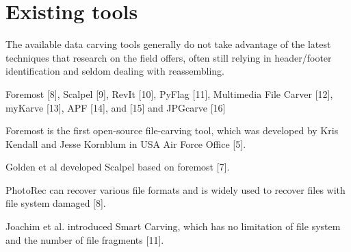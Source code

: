 \section{Existing tools}

The available data carving tools generally do not take advantage of the latest techniques that research on the field offers, often still relying in header/footer identification and seldom dealing with reassembling.

\cite{ali_review_2018}
Foremost [8], Scalpel [9],
RevIt [10], PyFlag [11], Multimedia File Carver
[12], myKarve [13], APF [14], and [15] and
JPGcarve [16]

\cite{qiu_new_2014}
Foremost is the first open-source file-carving tool, which
was developed by Kris Kendall and Jesse Kornblum in USA
Air Force Office [5].

Golden et al developed Scalpel based on foremost
[7].

PhotoRec can recover various file
formats and is widely used to recover files with file system
damaged [8].

Joachim et al. introduced Smart Carving, which
has no limitation of file system and the number of file
fragments [11].



